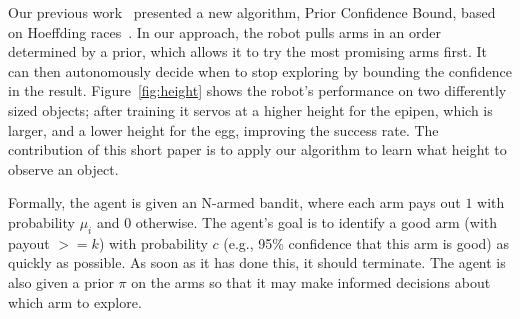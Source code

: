 \documentclass[conference,onecolumn]{IEEEtran}
\newcommand{\algorithmDTxt}{Prior Confidence Bound\xspace}
\begin{document}
Our previous work~\citep{oberlin15} presented a new algorithm,
\algorithmDTxt, based on Hoeffding races~\citep{maron93}. In our
approach, the robot pulls arms in an order determined by a prior,
which allows it to try the most promising arms first. It can then
autonomously decide when to stop exploring by bounding the confidence
in the result.  Figure~\ref{fig:height} shows the robot's performance
on two differently sized objects; after training it servos at a higher
height for the epipen, which is larger, and a lower height for the
egg, improving the success rate.  The contribution of this short paper
is to apply our algorithm to learn what height to observe an object.

Formally, the agent is given an N-armed bandit, where each arm pays
out $1$ with probability $\mu_i$ and $0$ otherwise.  The agent's goal
is to identify a good arm (with payout $>= k$) with probability $c$
(e.g., 95\% confidence that this arm is good) as quickly as possible.
As soon as it has done this, it should terminate.  The agent is also
given a prior $\pi$ on the arms so that it may make informed decisions
about which arm to explore.




\end{document}

